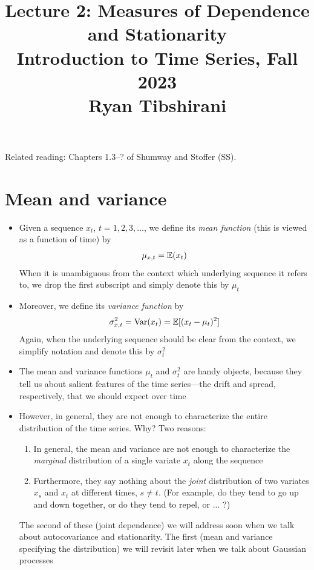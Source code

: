 \documentclass{article}
\title{Lecture 2: Measures of Dependence and Stationarity \\ \smallskip  
\large Introduction to Time Series, Fall 2023 \\ \smallskip
Ryan Tibshirani}
\date{}
\begin{document}
\maketitle
\RaggedRight
\vspace{-50pt}

Related reading: Chapters 1.3--? of Shumway and Stoffer (SS).

\section{Mean and variance}

\begin{itemize}
\item Given a sequence $x_t$, $t = 1,2,3,\dots$, we define its \emph{mean 
    function} (this is viewed as a function of time) by 
  \[
  \mu_{x,t} = \mathbb{E}(x_t)
  \]
  When it is unambiguous from the context which underlying sequence it refers
  to, we drop the first subscript and simply denote this by $\mu_t$

\item Moreover, we define its \emph{variance function} by
  \[
  \sigma^2_{x,t} = \operatorname{Var}(x_t) = \mathbb{E}[(x_t - \mu_t)^2]
  \]
  Again, when the underlying sequence should be clear from the context, we
  simplify notation and denote this by $\sigma^2_t$

\item The mean and variance functions $\mu_t$ and $\sigma^2_t$ are handy 
  objects, because they tell us about salient features of the time series---the
  drift and spread, respectively, that we should expect over time

\item However, in general, they are not enough to characterize the entire
  distribution of the time series. Why? Two reasons: 

  \begin{enumerate}
  \item In general, the mean and variance are not enough to characterize the
    \emph{marginal} distribution of a single variate $x_t$ along the sequence 

  \item Furthermore, they say nothing about the \emph{joint} distribution of
    two variates $x_s$ and $x_t$ at different times, $s \not= t$. (For example,
    do they tend to go up and down together, or do they tend to repel, or ... ?) 
  \end{enumerate}

  The second of these (joint dependence) we will address soon when we talk about
  autocovariance and stationarity. The first (mean and variance specifying the
  distribution) we will revisit later when we talk about Gaussian processes  


\end{itemize}
\end{document}
